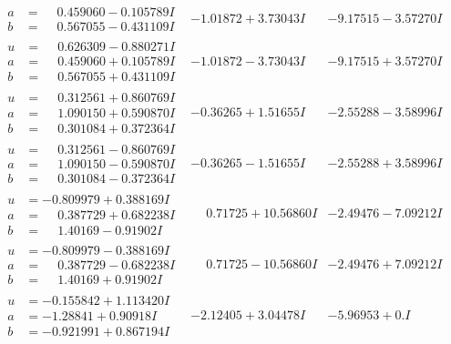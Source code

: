 \documentclass[1p]{elsarticle_modified}
\theoremstyle{definition}
\begin{document}
$$\begin{array}{c|c|c}
\begin{aligned}
a &= \phantom{-}0.459060 - 0.105789 I \\
b &= \phantom{-}0.567055 - 0.431109 I\end{aligned}
 & -1.01872 + 3.73043 I & -9.17515 - 3.57270 I \\ \hline\begin{aligned}
u &= \phantom{-}0.626309 - 0.880271 I \\
a &= \phantom{-}0.459060 + 0.105789 I \\
b &= \phantom{-}0.567055 + 0.431109 I\end{aligned}
 & -1.01872 - 3.73043 I & -9.17515 + 3.57270 I \\ \hline\begin{aligned}
u &= \phantom{-}0.312561 + 0.860769 I \\
a &= \phantom{-}1.090150 + 0.590870 I \\
b &= \phantom{-}0.301084 + 0.372364 I\end{aligned}
 & -0.36265 + 1.51655 I & -2.55288 - 3.58996 I \\ \hline\begin{aligned}
u &= \phantom{-}0.312561 - 0.860769 I \\
a &= \phantom{-}1.090150 - 0.590870 I \\
b &= \phantom{-}0.301084 - 0.372364 I\end{aligned}
 & -0.36265 - 1.51655 I & -2.55288 + 3.58996 I \\ \hline\begin{aligned}
u &= -0.809979 + 0.388169 I \\
a &= \phantom{-}0.387729 + 0.682238 I \\
b &= \phantom{-}1.40169 - 0.91902 I\end{aligned}
 & \phantom{-}0.71725 + 10.56860 I & -2.49476 - 7.09212 I \\ \hline\begin{aligned}
u &= -0.809979 - 0.388169 I \\
a &= \phantom{-}0.387729 - 0.682238 I \\
b &= \phantom{-}1.40169 + 0.91902 I\end{aligned}
 & \phantom{-}0.71725 - 10.56860 I & -2.49476 + 7.09212 I \\ \hline\begin{aligned}
u &= -0.155842 + 1.113420 I \\
a &= -1.28841 + 0.90918 I \\
b &= -0.921991 + 0.867194 I\end{aligned}
 & -2.12405 + 3.04478 I & -5.96953 + 0. I\phantom{ +0.000000I} \\ \hline\begin{aligned}

\end{aligned}
\end{array}$$
\end{document}
